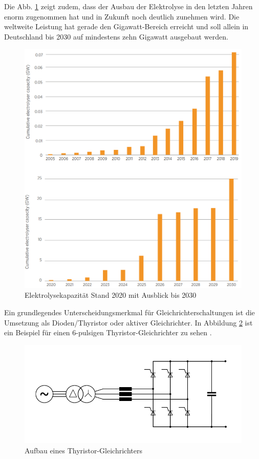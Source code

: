 Die Abb. \ref{fig:elycapacity} zeigt zudem, dass der Ausbau der Elektrolyse in den letzten Jahren enorm zugenommen hat und in Zukunft noch deutlich zunehmen wird. Die weltweite Leistung hat gerade den Gigawatt-Bereich erreicht und soll allein in Deutschland bis 2030 auf mindestens zehn Gigawatt ausgebaut werden.\\
	\begin{figure}
		\centering
		\includegraphics[width=0.7\linewidth]{content/Grafiken/Ely_Capacity}
		\caption[Elektrolyse Kapazität bis 2030]{Elektrolysekapazität Stand 2020 mit Ausblick bis 2030 \cite{IRENA2020}}
		\label{fig:elycapacity}
	\end{figure}
Ein grundlegendes Unterscheidungsmerkmal für Gleichrichterschaltungen ist die Umsetzung als Dioden/Thyristor oder aktiver Gleichrichter. In Abbildung \ref{fig:thyristor} ist ein Beispiel für einen 6-pulsigen Thyristor-Gleichrichter zu sehen . 
	\begin{figure} 
		\centering
		\includegraphics[width=0.9\linewidth]{content/Grafiken/Thyristor}
		\caption{Aufbau eines Thyristor-Gleichrichters}
		\label{fig:thyristor}
	\end{figure}
